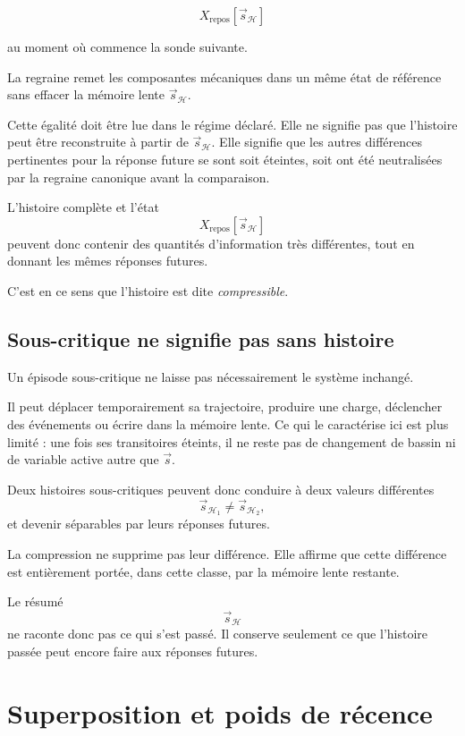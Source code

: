 \[
X_{\mathrm{repos}}[\vec s_{\mathcal H}]
\]

au moment où commence la sonde suivante.

La regraine remet les composantes mécaniques dans un même état de référence sans effacer la mémoire lente \(\vec s_{\mathcal H}\).

Cette égalité doit être lue dans le régime déclaré. Elle ne signifie pas que l'histoire peut être reconstruite à partir de $\vec s_{\mathcal H}$. Elle signifie que les autres différences pertinentes pour la réponse future se sont soit éteintes, soit ont été neutralisées par la regraine canonique avant la comparaison.

L'histoire complète et l'état
\[
X_{\mathrm{repos}}[\vec s_{\mathcal H}]
\]
peuvent donc contenir des quantités d'information très différentes, tout en donnant les mêmes réponses futures.

C'est en ce sens que l'histoire est dite \emph{compressible}.

\subsection{Sous-critique ne signifie pas sans histoire}

Un épisode sous-critique ne laisse pas nécessairement le système inchangé.

Il peut déplacer temporairement sa trajectoire, produire une charge, déclencher des événements ou écrire dans la mémoire lente. Ce qui le caractérise ici est plus limité : une fois ses transitoires éteints, il ne reste pas de changement de bassin ni de variable active autre que $\vec s$.

Deux histoires sous-critiques peuvent donc conduire à deux valeurs
différentes
\[
\vec s_{\mathcal H_1}
\neq
\vec s_{\mathcal H_2},
\]
et devenir séparables par leurs réponses futures.

La compression ne supprime pas leur différence. Elle affirme que cette différence est entièrement portée, dans cette classe, par la mémoire lente restante.

Le résumé
\[
\vec s_{\mathcal H}
\]
ne raconte donc pas ce qui s'est passé. Il conserve seulement ce que l'histoire passée peut encore faire aux réponses futures.

\section{Superposition et poids de récence}
\label{t3-superposition-recence}

